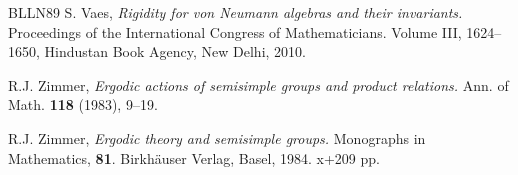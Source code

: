 \documentclass[11pt]{amsart}
\numberwithin{equation}{section}
\theoremstyle{plain}
\theoremstyle{definition}
\begin{document}
\begin{thebibliography}{BLLN89}
 {\sc S. Vaes}, {\it Rigidity for von Neumann algebras and their invariants.} Proceedings of the International Congress of Mathematicians. Volume III, 1624--1650, Hindustan Book Agency, New Delhi, 2010.

 {\sc R.J. Zimmer}, {\it Ergodic actions of semisimple groups and product relations.} Ann. of Math. {\bf 118} (1983), 9--19.

 {\sc R.J. Zimmer}, {\it Ergodic theory and semisimple groups.} Monographs in Mathematics, {\bf 81}. Birkh\"auser Verlag, Basel, 1984. x+209 pp.


\end{thebibliography}

\end{document}

